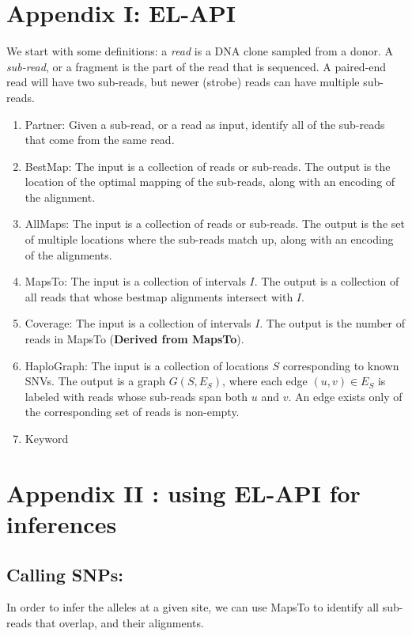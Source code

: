 \documentclass[10pt]{article}
\begin{document}
\newpage

\section{Appendix I: EL-API}

We start with some definitions: a \emph{read} is a DNA clone sampled
from a donor. A \emph{sub-read}, or a fragment is the part of the read
that is sequenced. A paired-end read will have two sub-reads, but
newer (strobe) reads can have multiple sub-reads.


\begin{enumerate}
\item {\sc Partner:} Given a sub-read, or a read as input, identify
  all of the sub-reads that come from the same read.
\item {\sc BestMap:} The input is a collection of reads or
  sub-reads. The output is the location of the optimal mapping of the
  sub-reads, along with an encoding of the alignment.
\item {\sc AllMaps:} The input is a collection of reads or
  sub-reads. The output is the set of multiple locations where the
  sub-reads match up, along with an encoding of the alignments.
\item {\sc MapsTo:} The input is a collection of intervals $I$. The
  output is a collection of all reads that whose bestmap alignments
  intersect with $I$.
\item {\sc Coverage:} The input is a collection of intervals $I$. The
  output is the number of reads in {\sc MapsTo} ({\bf Derived from
    MapsTo}).
\item {\sc HaploGraph:} The input is a collection of locations $S$
  corresponding to known SNVs. The output is a graph $G(S,E_S)$, where
  each edge $(u,v)\in E_S$ is labeled with reads whose sub-reads span
  both $u$ and $v$. An edge exists only of the corresponding set of
  reads is non-empty.
\item {\sc Keyword}
\end{enumerate}
\newpage
\section{Appendix II : using EL-API for inferences}
\subsection{Calling SNPs:}
In order to infer the alleles at a given site, we can use {\sc MapsTo}
to identify all sub-reads that overlap, and their alignments.
\end{document}
